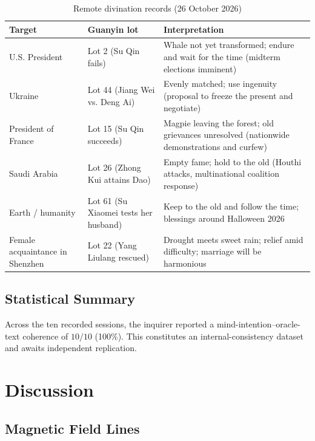 \documentclass[11pt,a4paper]{article}
\begin{document}
\begin{table}[htbp]
  \centering
  \caption{Remote divination records (26 October 2026)}
  \label{tab:remote}
  \begin{tabular}{@{}lp{3.2cm}p{7.5cm}@{}}
    \toprule
    \textbf{Target} & \textbf{Guanyin lot} & \textbf{Interpretation} \\
    \midrule
    U.S. President & Lot 2 (Su Qin fails) & Whale not yet transformed; endure and wait for the time (midterm elections imminent) \\
    Ukraine & Lot 44 (Jiang Wei vs. Deng Ai) & Evenly matched; use ingenuity (proposal to freeze the present and negotiate) \\
    President of France & Lot 15 (Su Qin succeeds) & Magpie leaving the forest; old grievances unresolved (nationwide demonstrations and curfew) \\
    Saudi Arabia & Lot 26 (Zhong Kui attains Dao) & Empty fame; hold to the old (Houthi attacks, multinational coalition response) \\
    Earth / humanity & Lot 61 (Su Xiaomei tests her husband) & Keep to the old and follow the time; blessings around Halloween 2026 \\
    Female acquaintance in Shenzhen & Lot 22 (Yang Liulang rescued) & Drought meets sweet rain; relief amid difficulty; marriage will be harmonious \\
    \bottomrule
  \end{tabular}
\end{table}

\subsection{Statistical Summary}

Across the ten recorded sessions, the inquirer reported a mind-intention--oracle-text coherence of $10/10$ (100\%). This constitutes an internal-consistency dataset and awaits independent replication.


\section{Discussion}

\subsection{Magnetic Field Lines}
\end{document}
